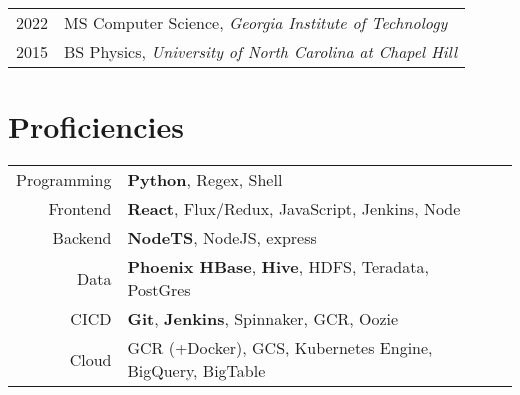 \documentclass[a4paper,10pt]{article} %
\begin{document}
\begin{tabular}{rl}	
2022 & MS Computer Science, \emph{Georgia Institute of Technology}\\
2015 & BS Physics, \emph{University of North Carolina at Chapel Hill}\\




\end{tabular}
\bigskip

\vspace{-8pt}
\section{Proficiencies}

\begin{tabular}{rlp{11cm}}
Programming &\textbf{Python}, Regex, Shell\\
Frontend &\textbf{React}, Flux/Redux, JavaScript, Jenkins, Node\\
Backend &\textbf{NodeTS}, NodeJS, express\\
Data &\textbf{Phoenix HBase}, \textbf{Hive}, HDFS, Teradata, PostGres\\
CICD &\textbf{Git}, \textbf{Jenkins}, Spinnaker, GCR, Oozie\\
Cloud &GCR (+Docker), GCS, Kubernetes Engine, BigQuery, BigTable



\end{tabular}
\end{document}
